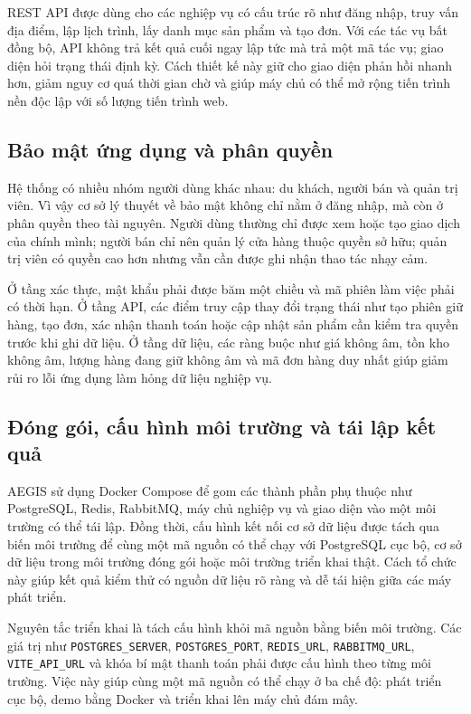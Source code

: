 \documentclass[12pt, a4paper]{article}
\begin{document}
REST API được dùng cho các nghiệp vụ có cấu trúc rõ như đăng nhập, truy vấn địa điểm, lập lịch trình, lấy danh mục sản phẩm và tạo đơn. Với các tác vụ bất đồng bộ, API không trả kết quả cuối ngay lập tức mà trả một mã tác vụ; giao diện hỏi trạng thái định kỳ. Cách thiết kế này giữ cho giao diện phản hồi nhanh hơn, giảm nguy cơ quá thời gian chờ và giúp máy chủ có thể mở rộng tiến trình nền độc lập với số lượng tiến trình web.

\subsection{Bảo mật ứng dụng và phân quyền}
Hệ thống có nhiều nhóm người dùng khác nhau: du khách, người bán và quản trị viên. Vì vậy cơ sở lý thuyết về bảo mật không chỉ nằm ở đăng nhập, mà còn ở phân quyền theo tài nguyên. Người dùng thường chỉ được xem hoặc tạo giao dịch của chính mình; người bán chỉ nên quản lý cửa hàng thuộc quyền sở hữu; quản trị viên có quyền cao hơn nhưng vẫn cần được ghi nhận thao tác nhạy cảm.

Ở tầng xác thực, mật khẩu phải được băm một chiều và mã phiên làm việc phải có thời hạn. Ở tầng API, các điểm truy cập thay đổi trạng thái như tạo phiên giữ hàng, tạo đơn, xác nhận thanh toán hoặc cập nhật sản phẩm cần kiểm tra quyền trước khi ghi dữ liệu. Ở tầng dữ liệu, các ràng buộc như giá không âm, tồn kho không âm, lượng hàng đang giữ không âm và mã đơn hàng duy nhất giúp giảm rủi ro lỗi ứng dụng làm hỏng dữ liệu nghiệp vụ.

\subsection{Đóng gói, cấu hình môi trường và tái lập kết quả}
AEGIS sử dụng Docker Compose để gom các thành phần phụ thuộc như PostgreSQL, Redis, RabbitMQ, máy chủ nghiệp vụ và giao diện vào một môi trường có thể tái lập. Đồng thời, cấu hình kết nối cơ sở dữ liệu được tách qua biến môi trường để cùng một mã nguồn có thể chạy với PostgreSQL cục bộ, cơ sở dữ liệu trong môi trường đóng gói hoặc môi trường triển khai thật. Cách tổ chức này giúp kết quả kiểm thử có nguồn dữ liệu rõ ràng và dễ tái hiện giữa các máy phát triển.

Nguyên tắc triển khai là tách cấu hình khỏi mã nguồn bằng biến môi trường. Các giá trị như \texttt{POSTGRES\_SERVER}, \texttt{POSTGRES\_PORT}, \texttt{REDIS\_URL}, \texttt{RABBITMQ\_URL}, \texttt{VITE\_API\_URL} và khóa bí mật thanh toán phải được cấu hình theo từng môi trường. Việc này giúp cùng một mã nguồn có thể chạy ở ba chế độ: phát triển cục bộ, demo bằng Docker và triển khai lên máy chủ đám mây.
\end{document}
